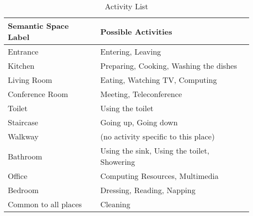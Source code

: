 

\begin{table}[]
\begin{tabular}{|l|l|}
\hline
Semantic Space Label & Possible Activities                         \\ \hline
Entrance             & Entering, Leaving                           \\ \hline
Kitchen              & Preparing, Cooking, Washing the dishes      \\ \hline
Living Room          & Eating, Watching TV, Computing              \\ \hline
Conference Room      & Meeting, Teleconference                     \\ \hline
Toilet               & Using the toilet                            \\ \hline
Staircase            & Going up, Going down                        \\ \hline
Walkway              & (no activity specific to this place)        \\ \hline
Bathroom             & Using the sink, Using the toilet, Showering \\ \hline
Office               & Computing Resources, Multimedia             \\ \hline
Bedroom              & Dressing, Reading, Napping                  \\ \hline
Common to all places & Cleaning                                    \\ \hline
\end{tabular}
\caption{Activity List \cite{cumin2017dataset}}
\label{table:activity}
\end{table}
